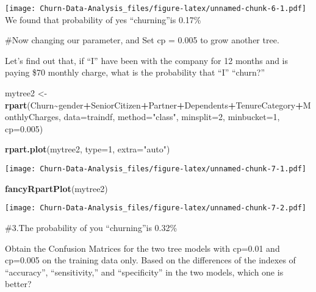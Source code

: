 \documentclass[
]{article}
\newenvironment{Shaded}{\begin{snugshade}}{\end{snugshade}}
\newcommand{\AttributeTok}[1]{\textcolor[rgb]{0.13,0.29,0.53}{#1}}
\newcommand{\DecValTok}[1]{\textcolor[rgb]{0.00,0.00,0.81}{#1}}
\newcommand{\FloatTok}[1]{\textcolor[rgb]{0.00,0.00,0.81}{#1}}
\newcommand{\FunctionTok}[1]{\textcolor[rgb]{0.13,0.29,0.53}{\textbf{#1}}}
\newcommand{\NormalTok}[1]{#1}
\newcommand{\OtherTok}[1]{\textcolor[rgb]{0.56,0.35,0.01}{#1}}
\newcommand{\SpecialCharTok}[1]{\textcolor[rgb]{0.81,0.36,0.00}{\textbf{#1}}}
\newcommand{\StringTok}[1]{\textcolor[rgb]{0.31,0.60,0.02}{#1}}
\begin{document}
\texttt{[image: Churn-Data-Analysis\_files/figure-latex/unnamed-chunk-6-1.pdf]}
We found that probability of yes ``churning''is 0.17\%

\#Now changing our parameter, and Set cp = 0.005 to grow another tree.

Let's find out that, if ``I'' have been with the company for 12 months
and is paying \$70 monthly charge, what is the probability that ``I''
``churn?''

\begin{Shaded}
\begin{Highlighting}[]
\NormalTok{mytree2 }\OtherTok{\textless{}{-}} \FunctionTok{rpart}\NormalTok{(Churn}\SpecialCharTok{\textasciitilde{}}\NormalTok{gender}\SpecialCharTok{+}\NormalTok{SeniorCitizen}\SpecialCharTok{+}\NormalTok{Partner}\SpecialCharTok{+}\NormalTok{Dependents}\SpecialCharTok{+}\NormalTok{TenureCategory}\SpecialCharTok{+}\NormalTok{MonthlyCharges,}
              \AttributeTok{data=}\NormalTok{traindf,}
              \AttributeTok{method=}\StringTok{"class"}\NormalTok{,}
              \AttributeTok{minsplit=}\DecValTok{2}\NormalTok{,}
              \AttributeTok{minbucket=}\DecValTok{1}\NormalTok{,}
              \AttributeTok{cp=}\FloatTok{0.005}\NormalTok{)}

\FunctionTok{rpart.plot}\NormalTok{(mytree2, }\AttributeTok{type=}\DecValTok{1}\NormalTok{, }\AttributeTok{extra=}\StringTok{"auto"}\NormalTok{)}
\end{Highlighting}
\end{Shaded}

\texttt{[image: Churn-Data-Analysis\_files/figure-latex/unnamed-chunk-7-1.pdf]}

\begin{Shaded}
\begin{Highlighting}[]
\FunctionTok{fancyRpartPlot}\NormalTok{(mytree2) }
\end{Highlighting}
\end{Shaded}

\texttt{[image: Churn-Data-Analysis\_files/figure-latex/unnamed-chunk-7-2.pdf]}

\#3.The probability of you ``churning''is 0.32\%

Obtain the Confusion Matrices for the two tree models with cp=0.01 and
cp=0.005 on the training data only. Based on the differences of the
indexes of ``accuracy'', ``sensitivity,'' and ``specificity'' in the two
models, which one is better?

\begin{Shaded}
\end{Shaded}
\end{document}
